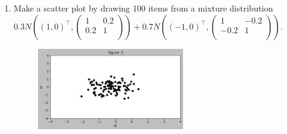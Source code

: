 \documentclass[a4paper]{article}
\theoremstyle{definition}
\newenvironment{soln}{
    \leavevmode\color{blue}\ignorespaces
}{}
\begin{document}
\begin{enumerate}
\begin{soln}
	\end{soln}

\item Make a scatter plot by drawing 100 items from a mixture distribution 
$0.3 N\left((1, 0)^\top, \begin{pmatrix} 1 & 0.2 \\ 0.2 & 1\\ \end{pmatrix}\right)
+0.7 N\left((-1, 0)^\top, \begin{pmatrix} 1 & -0.2 \\ -0.2 & 1\\ \end{pmatrix}\right)
$.

  	\begin{soln}
		
		\begin{figure}[h!]
	        \centering
	        \includegraphics[width=0.6\textwidth]{Assignment_1_Q8_3.png} 
	        \captionsetup{labelformat=empty}
	        \caption{}
	        \label{Fig:3}
	        \end{figure}

	\end{soln}
\end{enumerate}





\end{document}

